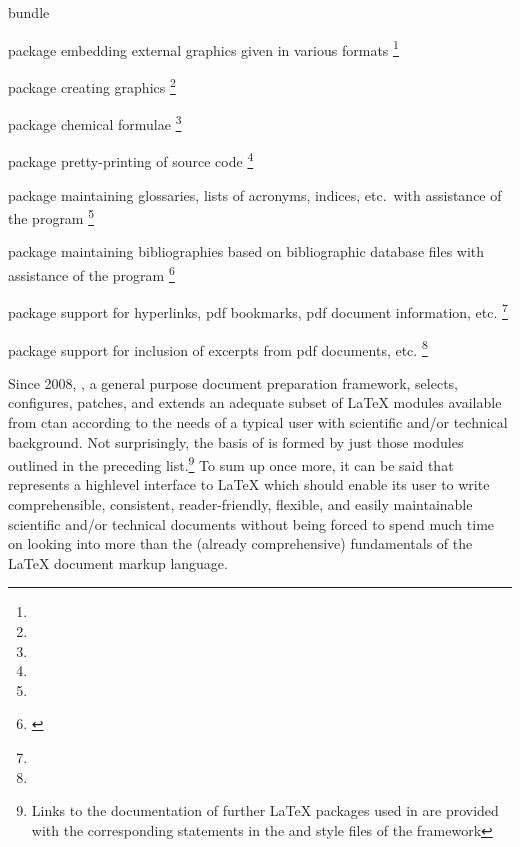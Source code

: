 \begin{labeling}[→]{\KOMAScript{} bundle}
   \item[\entity{graphicx} package]%
      embedding external graphics given in various formats%
      \footnote{}
   \item[\entity{pgf} package]%
      creating graphics%
      \footnote{}
   \item[\entity{mhchem} package]%
      chemical formulae%
      \footnote{}
   \item[\entity{listings} package]%
      pretty-printing of source code%
      \footnote{}
   \item[\entity{glossaries} package]%
      maintaining glossaries, lists of acronyms, indices, etc.\ with
      assistance of the  program%
      \footnote{}
   \item[\entity{biblatex} package]%
      maintaining bibliographies based on \BibTeX{} bibliographic database
      files with assistance of the  program%
      \footnote{\label{fnote:biblatex}}
   \item[\entity{hyperref} package]%
      support for hyperlinks, \ac{pdf} bookmarks, \ac{pdf} document
      information, etc.%
      \footnote{}
   \item[\entity{pdfpages} package]%
      support for inclusion of excerpts from \ac{pdf} documents, etc.%
      \footnote{}
\end{labeling}


Since 2008, \wegcLaTeX{}, a general purpose document preparation
framework, selects, configures, patches, and extends an adequate
subset of \LaTeX{} modules available from \ac{ctan} according to the
needs of a typical user with scientific and/or technical
background. Not surprisingly, the basis of \wegcLaTeX{} is formed by
just those modules outlined in the preceding list.\footnote{Links to
  the documentation of further \LaTeX{} packages used in \wegcLaTeX{}
  are provided with the corresponding \latexcmd{\RequirePackage{}}
  statements in the  and  style
  files of the \wegcLaTeX{} framework} To sum up once more, it can be
said that \wegcLaTeX{} represents a highlevel interface to \LaTeX{}
which should enable its user to write comprehensible, consistent,
reader-friendly, flexible, and easily maintainable scientific and/or
technical documents without being forced to spend much time on looking
into more than the (already comprehensive) fundamentals of the
\LaTeX{} document markup language.
